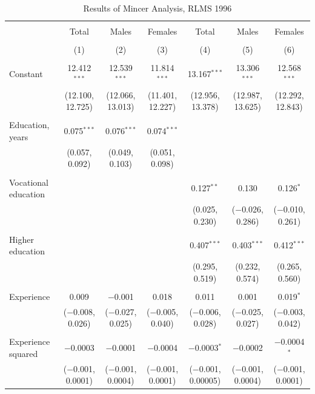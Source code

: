 \documentclass[12pt,a4paper]{article}
\numberwithin{equation}{section}
\begin{document}
\begin{landscape}
	
	\fontsize{9}{11}
	\selectfont
	
	\begin{table}[!htbp] \centering 
		\caption{Results of Mincer Analysis, RLMS 1996} 
		\label{} 
		\begin{tabular}{@{\extracolsep{5pt}}lcccccc} 
			\\[-1.8ex]\hline 
			\hline \\[-1.8ex] 
			& Total & Males & Females & Total & Males & Females \\ 
			\\[-1.8ex] & (1) & (2) & (3) & (4) & (5) & (6)\\ 
			\hline \\[-1.8ex] 
			Constant & 12.412$^{***}$ & 12.539$^{***}$ & 11.814$^{***}$ & 13.167$^{***}$ & 13.306$^{***}$ & 12.568$^{***}$ \\ 
			& (12.100, 12.725) & (12.066, 13.013) & (11.401, 12.227) & (12.956, 13.378) & (12.987, 13.625) & (12.292, 12.843) \\ 
			& & & & & & \\ 
			Education, years & 0.075$^{***}$ & 0.076$^{***}$ & 0.074$^{***}$ &  &  &  \\ 
			& (0.057, 0.092) & (0.049, 0.103) & (0.051, 0.098) &  &  &  \\ 
			& & & & & & \\ 
			Vocational education &  &  &  & 0.127$^{**}$ & 0.130 & 0.126$^{*}$ \\ 
			&  &  &  & (0.025, 0.230) & ($-$0.026, 0.286) & ($-$0.010, 0.261) \\ 
			& & & & & & \\ 
			Higher education &  &  &  & 0.407$^{***}$ & 0.403$^{***}$ & 0.412$^{***}$ \\ 
			&  &  &  & (0.295, 0.519) & (0.232, 0.574) & (0.265, 0.560) \\ 
			& & & & & & \\ 
			Experience & 0.009 & $-$0.001 & 0.018 & 0.011 & 0.001 & 0.019$^{*}$ \\ 
			& ($-$0.008, 0.026) & ($-$0.027, 0.025) & ($-$0.005, 0.040) & ($-$0.006, 0.028) & ($-$0.025, 0.027) & ($-$0.003, 0.042) \\ 
			& & & & & & \\ 
			Experience squared & $-$0.0003 & $-$0.0001 & $-$0.0004 & $-$0.0003$^{*}$ & $-$0.0002 & $-$0.0004$^{*}$ \\ 
			& ($-$0.001, 0.0001) & ($-$0.001, 0.0004) & ($-$0.001, 0.0001) & ($-$0.001, 0.00005) & ($-$0.001, 0.0004) & ($-$0.001, 0.0001) \\ 

\end{tabular}
\end{table}
\end{landscape}
\end{document}

